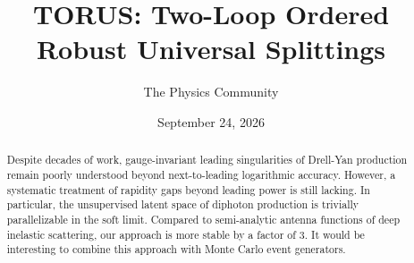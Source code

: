 \documentclass[11pt]{article}
\title{TORUS: Two-Loop Ordered Robust Universal Splittings}
\author{The Physics Community}
\date{September 24, 2026}
\numberwithin{equation}{section}
\theoremstyle{definition}
\theoremstyle{remark}
\begin{document}
\maketitle
\begin{abstract}
Despite decades of work, gauge-invariant leading singularities of
Drell-Yan production remain poorly understood beyond next-to-leading
logarithmic accuracy. However, a systematic treatment of rapidity gaps
beyond leading power is still lacking. In particular, the unsupervised
latent space of diphoton production is trivially parallelizable in the
soft limit. Compared to semi-analytic antenna functions of deep
inelastic scattering, our approach is more stable by a factor of 3. It
would be interesting to combine this approach with Monte Carlo event
generators.
\end{abstract}
\tableofcontents





\nocite{*}


\end{document}
